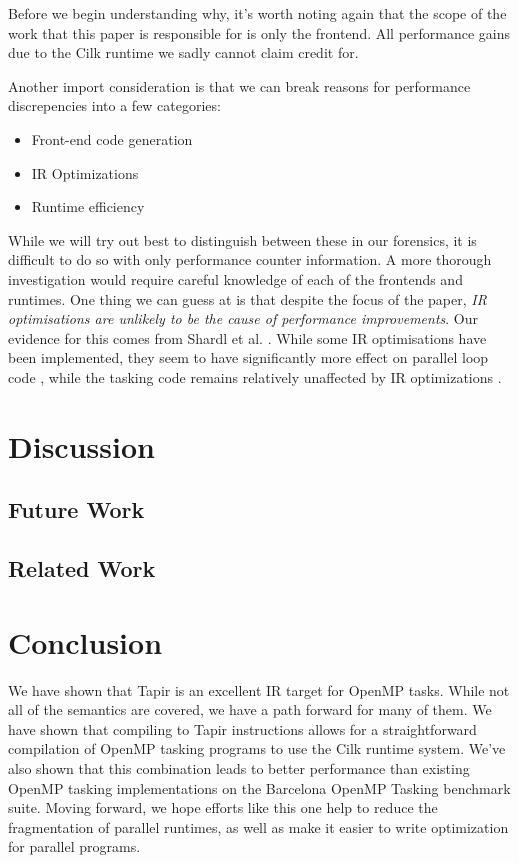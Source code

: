 \documentclass[sigconf]{acmart}
\begin{document}
Before we begin understanding why, it's worth noting again that the scope of the 
work that this paper is responsible for is only the frontend. All performance
gains due to the Cilk runtime we sadly cannot claim credit for.

Another import consideration is that we can break reasons for performance
discrepencies into a few categories: 

\begin{itemize}
\item Front-end code generation
\item IR Optimizations
\item Runtime efficiency
\end{itemize}

While we will try out best to distinguish between these in our forensics, it is 
difficult to do so with only performance counter information. A more thorough
investigation would require careful knowledge of each of the frontends and
runtimes. One thing we can guess at is that despite the focus of the paper,
\emph{IR optimisations are unlikely to be the cause of performance
improvements}. Our evidence for this comes from Shardl et al. \cite{}. While
some IR optimisations have been implemented, they seem to have significantly
more effect on parallel loop code , while the tasking code remains
relatively unaffected by IR optimizations \cite{}. 

\section{Discussion} \label{Sec:Discussion}

\subsection{Future Work} \label{Sec:Future}

\subsection{Related Work} \label{Sec:Related}

\section{Conclusion} \label{Sec:Conclusion}
We have shown that Tapir is an excellent IR target for OpenMP tasks. While not
all of the semantics are covered, we have a path forward for many of them. We have
shown that compiling to Tapir instructions allows for a straightforward compilation of 
OpenMP tasking programs to use the Cilk runtime system. We've also shown that this
combination leads to better performance than existing OpenMP tasking implementations
on the Barcelona OpenMP Tasking benchmark suite. Moving forward, we hope efforts like
this one help to reduce the fragmentation of parallel runtimes, as well as make
it easier to write optimization for parallel programs. 



\end{document}
